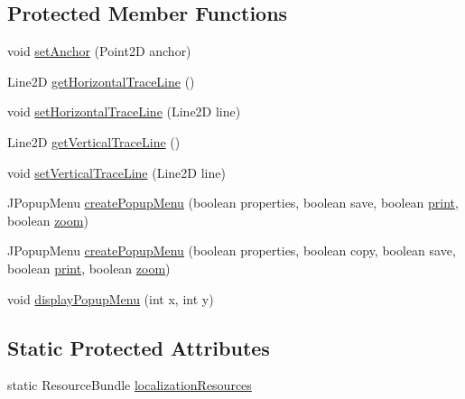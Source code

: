 \subsection*{Protected Member Functions}
\begin{DoxyCompactItemize}
\item 
void \mbox{\hyperlink{classorg_1_1jfree_1_1chart_1_1_chart_panel_ae38e2217bd007828533fd489f996ace3}{set\+Anchor}} (Point2D anchor)
\item 
Line2D \mbox{\hyperlink{classorg_1_1jfree_1_1chart_1_1_chart_panel_aae44b4bd954390305d39a58a96aa42ff}{get\+Horizontal\+Trace\+Line}} ()
\item 
void \mbox{\hyperlink{classorg_1_1jfree_1_1chart_1_1_chart_panel_af05196ce8bb83ce1a86bfb5043994454}{set\+Horizontal\+Trace\+Line}} (Line2D line)
\item 
Line2D \mbox{\hyperlink{classorg_1_1jfree_1_1chart_1_1_chart_panel_a59afa34b7ced440adb2c7a5a2a668f02}{get\+Vertical\+Trace\+Line}} ()
\item 
void \mbox{\hyperlink{classorg_1_1jfree_1_1chart_1_1_chart_panel_a53ac943a87b0d5c177ed911a7df69a72}{set\+Vertical\+Trace\+Line}} (Line2D line)
\item 
J\+Popup\+Menu \mbox{\hyperlink{classorg_1_1jfree_1_1chart_1_1_chart_panel_ad74ad2a6734dad9b69c3082de93e568f}{create\+Popup\+Menu}} (boolean properties, boolean save, boolean \mbox{\hyperlink{classorg_1_1jfree_1_1chart_1_1_chart_panel_a5d268d825853e74d978f93bd962c87a9}{print}}, boolean \mbox{\hyperlink{classorg_1_1jfree_1_1chart_1_1_chart_panel_a38d1f7fc6721aef92a30c0b79ecdaed9}{zoom}})
\item 
J\+Popup\+Menu \mbox{\hyperlink{classorg_1_1jfree_1_1chart_1_1_chart_panel_af5e72c59eed523bdd47cb8330197dd3c}{create\+Popup\+Menu}} (boolean properties, boolean copy, boolean save, boolean \mbox{\hyperlink{classorg_1_1jfree_1_1chart_1_1_chart_panel_a5d268d825853e74d978f93bd962c87a9}{print}}, boolean \mbox{\hyperlink{classorg_1_1jfree_1_1chart_1_1_chart_panel_a38d1f7fc6721aef92a30c0b79ecdaed9}{zoom}})
\item 
void \mbox{\hyperlink{classorg_1_1jfree_1_1chart_1_1_chart_panel_afcbf27c6c1884c2ca3fdb6a93102c913}{display\+Popup\+Menu}} (int x, int y)
\end{DoxyCompactItemize}
\subsection*{Static Protected Attributes}
\begin{DoxyCompactItemize}
\item 
static Resource\+Bundle \mbox{\hyperlink{classorg_1_1jfree_1_1chart_1_1_chart_panel_a3ba0e3012aea9c7effadb438467fcdcb}{localization\+Resources}}
\end{DoxyCompactItemize}


